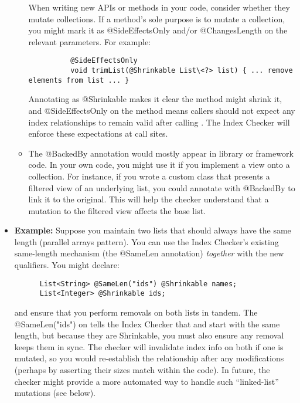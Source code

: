 \begin{itemize}
\begin{itemize}
      When writing new APIs or methods in your code, consider whether they mutate collections. If a method’s sole
      purpose is to mutate a collection, you might mark it as @SideEffectsOnly and/or @ChangesLength on the
      relevant parameters. For example:
        \begin{Verbatim}
          @SideEffectsOnly
          void trimList(@Shrinkable List\<?> list) { ... remove elements from list ... }
        \end{Verbatim}
      Annotating  as @Shrinkable makes it clear the method might shrink it, and @SideEffectsOnly
      on the method means callers should not expect any index relationships to remain valid after calling
      . The Index Checker will enforce these expectations at call sites.
    \item
      The @BackedBy annotation would mostly appear in library or framework code. In your own code, you might use
      it if you implement a view onto a collection. For instance, if you wrote a custom class 
      that presents a filtered view of an underlying list, you could annotate  with @BackedBy
      to link it to the original. This will help the checker understand that a mutation to the filtered view
      affects the base list.
  \end{itemize}
\item
  \textbf{Example:}
    Suppose you maintain two lists that should always have the same length (parallel arrays pattern).
    You can use the Index Checker’s existing same-length mechanism (the @SameLen annotation)
    \emph{together} with the new qualifiers. You might declare:

    \begin{Verbatim}
      List<String> @SameLen("ids") @Shrinkable names;
      List<Integer> @Shrinkable ids;
    \end{Verbatim}
  and ensure that you perform removals on both lists in tandem. The @SameLen("ids") on 
  tells the Index Checker that  and  start with the same length, but because
  they are Shrinkable, you must also ensure any removal keeps them in sync. The checker will
  invalidate index info on both if one is mutated, so you would re-establish the relationship
  after any modifications (perhaps by asserting their sizes match within the code). In future, the
  checker might provide a more automated way to handle such “linked-list” mutations (see below).


\end{itemize}
